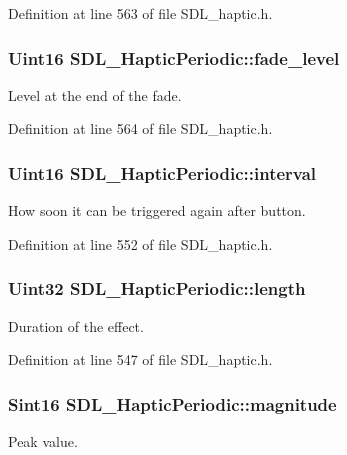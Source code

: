 Definition at line 563 of file S\+D\+L\+\_\+haptic.\+h.

\hypertarget{structSDL__HapticPeriodic_afa7713fc264959873f2a852fca4174fd}{
\subsubsection[{fade\+\_\+level}]{\setlength{\rightskip}{0pt plus 5cm}Uint16 S\+D\+L\+\_\+\+Haptic\+Periodic\+::fade\+\_\+level}}\label{structSDL__HapticPeriodic_afa7713fc264959873f2a852fca4174fd}
Level at the end of the fade. 

Definition at line 564 of file S\+D\+L\+\_\+haptic.\+h.

\hypertarget{structSDL__HapticPeriodic_a076d266e917098d89b2385b631629162}{
\subsubsection[{interval}]{\setlength{\rightskip}{0pt plus 5cm}Uint16 S\+D\+L\+\_\+\+Haptic\+Periodic\+::interval}}\label{structSDL__HapticPeriodic_a076d266e917098d89b2385b631629162}
How soon it can be triggered again after button. 

Definition at line 552 of file S\+D\+L\+\_\+haptic.\+h.

\hypertarget{structSDL__HapticPeriodic_a0ef0b17c54aaa5c99886c2a618444026}{
\subsubsection[{length}]{\setlength{\rightskip}{0pt plus 5cm}Uint32 S\+D\+L\+\_\+\+Haptic\+Periodic\+::length}}\label{structSDL__HapticPeriodic_a0ef0b17c54aaa5c99886c2a618444026}
Duration of the effect. 

Definition at line 547 of file S\+D\+L\+\_\+haptic.\+h.

\hypertarget{structSDL__HapticPeriodic_aad0ad2b00c7e6959da627663d91f7b94}{
\subsubsection[{magnitude}]{\setlength{\rightskip}{0pt plus 5cm}Sint16 S\+D\+L\+\_\+\+Haptic\+Periodic\+::magnitude}}\label{structSDL__HapticPeriodic_aad0ad2b00c7e6959da627663d91f7b94}
Peak value. 


